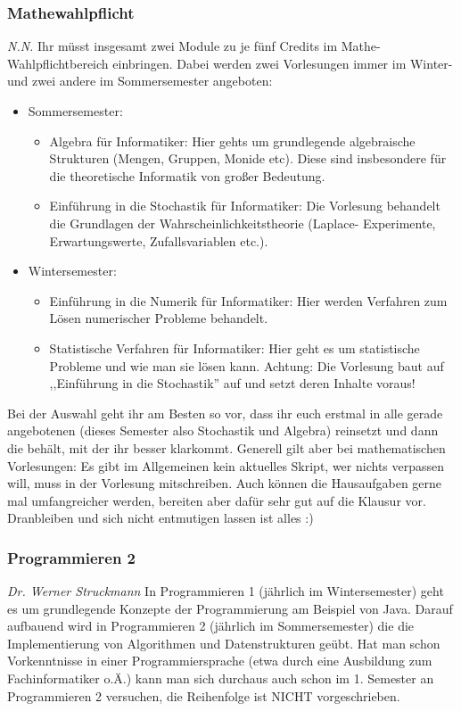 \begin{multicols}{2}
\subsubsection{Mathewahlpflicht}
	\textit{N.N.} Ihr müsst insgesamt zwei Module zu je fünf Credits
	im Mathe-Wahlpflichtbereich einbringen. Dabei werden zwei
	Vorlesungen immer im Winter- und zwei andere im Sommersemester
	angeboten:
	\begin{itemize}
	  \item Sommersemester: 
	    \begin{itemize} 
	      \item Algebra für Informatiker: Hier gehts um grundlegende
		algebraische Strukturen (Mengen, Gruppen, Monide etc). Diese sind insbesondere für die
		theoretische Informatik von großer Bedeutung.
	      \item Einführung in die Stochastik für Informatiker: Die
		Vorlesung behandelt die Grundlagen der
		Wahrscheinlichkeitstheorie (Laplace- Experimente,
		Erwartungswerte, Zufallsvariablen etc.). 
	    \end{itemize}
	  \item Wintersemester: 
	    \begin{itemize}
	      \item Einführung in die Numerik für Informatiker: Hier
		werden Verfahren zum Lösen numerischer Probleme
		behandelt. 
	      \item Statistische Verfahren für Informatiker: Hier geht
		es um statistische Probleme und wie man sie lösen kann.
		Achtung: Die Vorlesung baut auf  ,,Einführung in
		die Stochastik'' auf und setzt deren Inhalte voraus!
	    \end{itemize}
	\end{itemize}
	Bei der Auswahl geht ihr am Besten so vor, dass ihr euch erstmal
	in alle gerade angebotenen (dieses Semester also Stochastik und
	Algebra) reinsetzt und dann die behält, mit der ihr besser
	klarkommt. Generell gilt aber bei mathematischen Vorlesungen: Es
	gibt im Allgemeinen kein aktuelles Skript, wer nichts verpassen
	will, muss in der Vorlesung mitschreiben. Auch können die
	Hausaufgaben gerne mal umfangreicher werden, bereiten aber dafür
	sehr gut auf die Klausur vor. Dranbleiben und sich nicht
	entmutigen lassen ist alles :)

\subsubsection{Programmieren 2}
	\textit{Dr. Werner Struckmann}
	In Programmieren 1 (jährlich im Wintersemester) geht es um grundlegende Konzepte der Programmierung am Beispiel von Java. Darauf aufbauend wird in Programmieren 2 (jährlich im Sommersemester) die die Implementierung von Algorithmen und Datenstrukturen geübt. Hat man schon Vorkenntnisse in einer Programmiersprache (etwa durch eine Ausbildung zum Fachinformatiker o.Ä.) kann man sich durchaus auch schon im 1. Semester an Programmieren 2 versuchen, die Reihenfolge ist NICHT vorgeschrieben.


\end{multicols}
